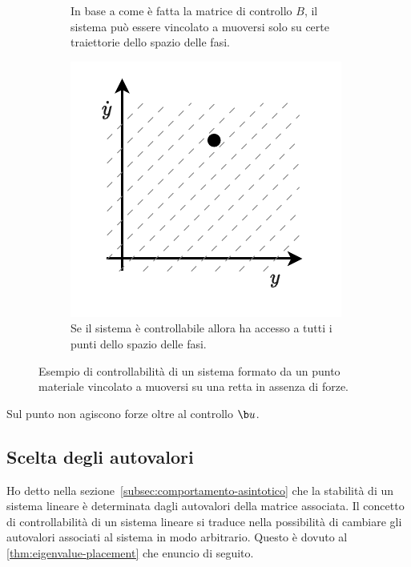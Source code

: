 \begin{example}
\begin{figure}[H]
\begin{subfigure}[t]{0.30\textwidth}
            \caption{In base a come è fatta la matrice di controllo $B$, il sistema può
            essere vincolato a muoversi solo su certe traiettorie dello spazio delle fasi.}
            \label{fig:ex-uncontrollable}
        \end{subfigure}
        \hfill
        \begin{subfigure}[t]{0.30\textwidth}
                  \centering
                  \includegraphics[width=\textwidth]{assets/ex-pianocartesiano-controllable}
                  \caption{Se il sistema è controllabile allora ha accesso a
                  tutti i punti dello spazio delle fasi.}
            \label{fig:ex-controllable}
        \end{subfigure}

        \caption[Punto materiale su una retta]{Esempio di controllabilità di
        un sistema formato da un punto materiale vincolato a muoversi su una retta
        in assenza di forze.}%
    \end{figure}


    Sul punto non agiscono forze oltre al controllo $\b u$.
    \label{ex:controllabilità}
\end{example}

\subsection{Scelta degli autovalori}
\label{subsec:scelta-autovalori}
Ho detto nella sezione~\ref{subsec:comportamento-asintotico} che la stabilità
di un sistema lineare è determinata dagli autovalori della matrice associata.
Il concetto di controllabilità di un sistema lineare si traduce nella possibilità
di cambiare gli autovalori associati al sistema in modo arbitrario.
Questo è dovuto al \autoref{thm:eigenvalue-placement} che enuncio di seguito.

